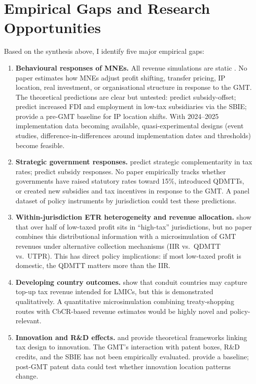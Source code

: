 \documentclass[11pt,a4paper]{article}
\begin{document}
\section{Empirical Gaps and Research Opportunities}
\label{sec:gaps}


Based on the synthesis above, I identify five major empirical gaps:

\begin{enumerate}

\item \textbf{Behavioural responses of MNEs.} All revenue simulations are static \citep{barake2022,hugger2025}. No paper estimates how MNEs adjust profit shifting, transfer pricing, IP location, real investment, or organisational structure in response to the GMT. The theoretical predictions are clear but untested: \citet{janeba2023} predict subsidy-offset; \citet{schjelderup2024} predict increased FDI and employment in low-tax subsidiaries via the SBIE; \citet{bilicka2023} provide a pre-GMT baseline for IP location shifts. With 2024--2025 implementation data becoming available, quasi-experimental designs (event studies, difference-in-differences around implementation dates and thresholds) become feasible.

\item \textbf{Strategic government responses.} \citet{hebous2023} predict strategic complementarity in tax rates; \citet{janeba2023} predict subsidy responses. No paper empirically tracks whether governments have raised statutory rates toward 15\%, introduced QDMTTs, or created new subsidies and tax incentives in response to the GMT. A panel dataset of policy instruments by jurisdiction could test these predictions.

\item \textbf{Within-jurisdiction ETR heterogeneity and revenue allocation.} \citet{hugger2025} show that over half of low-taxed profit sits in ``high-tax'' jurisdictions, but no paper combines this distributional information with a microsimulation of GMT revenues under alternative collection mechanisms (IIR vs.\ QDMTT vs.\ UTPR). This has direct policy implications: if most low-taxed profit is domestic, the QDMTT matters more than the IIR.

\item \textbf{Developing country outcomes.} \citet{vantriet2025} show that conduit countries may capture top-up tax revenue intended for LMICs, but this is demonstrated qualitatively. A quantitative microsimulation combining treaty-shopping routes with CbCR-based revenue estimates would be highly novel and policy-relevant.

\item \textbf{Innovation and R\&D effects.} \citet{akcigit2022} and \citet{schjelderup2024} provide theoretical frameworks linking tax design to innovation. The GMT's interaction with patent boxes, R\&D credits, and the SBIE has not been empirically evaluated. \citet{bilicka2023} provide a baseline; post-GMT patent data could test whether innovation location patterns change.

\end{enumerate}
\end{document}
